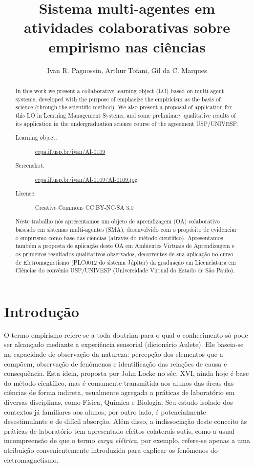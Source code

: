 \documentclass{article}
\title{Sistema multi-agentes em atividades colaborativas sobre empirismo nas ciências}
\author{Ivan R. Pagnossin\inst{1}, Arthur Tofani\inst{1}, Gil da C. Marques\inst{1}}
\begin{document}
\maketitle

\begin{abstract}
In this work we present a collaborative learning object (LO) based on multi-agent systems,
developed with the purpose of emphasize the empiricism as the basis of science (through the scientific method).
We also present a proposal of application for this LO in Learning Management Systems,
and some preliminary qualitative results of its application in the undergraduation science course of the agreement USP/UNIVESP.

\begin{description}
\item[Learning object:] \url{cepa.if.usp.br/ivan/AI-0109}
\item[Screenshot:] \url{cepa.if.usp.br/ivan/AI-0109/AI-0109.jpg}
\item[License:] Creative Commons CC BY-NC-SA 3.0
\end{description}
\end{abstract}

\begin{abstract}
Neste trabalho nós apresentamos um objeto de aprendizagem (OA) colaborativo baseado em sistemas multi-agentes (SMA),
desenvolvido com o propósito de evidenciar o empirismo como base das ciências (através do método científico).
Apresentamos também a proposta de aplicação deste OA em Ambientes Virtuais de Aprendizagem e os primeiros resultados qualitativos
observados, decorrentes de sua aplicação no curso de Eletromagnetismo (PLC0012 do sistema Júpiter) da graduação em
Licenciatura em Ciências do convênio USP/UNIVESP (Universidade Virtual do Estado de São Paulo).
\end{abstract}

\section{Introdução}

O termo empirismo refere-se a toda doutrina para o qual o conhecimento só pode
ser alcançado mediante a experiência sensorial (dicionário Aulete). Ele baseia-se
na capacidade de observação da natureza: percepção dos elementos que a compõem,
observação de fenômenos e identificação das relações de causa e consequência. Esta
ideia, proposta por John Locke no séc. XVI, ainda hoje é base do método científico,
mas é comumente transmitida aos alunos das áreas das ciências de forma indireta,
usualmente agregada a práticas de laboratório em diversas disciplinas, como Física,
Química e Biologia. Seu estudo isolado dos contextos já familiares aos alunos, por outro
lado, é potencialmente desestimulante e de difícil absorção. Além disso, a indissociação
deste conceito às práticas de laboratório tem apresentado efeitos colaterais sutis,
como a usual incompreensão de que o termo \emph{carga elétrica}, por exemplo, refere-se
apenas a uma atribuição convenientemente introduzida para explicar os fenômenos do
eletromagnetismo.
\end{document}
